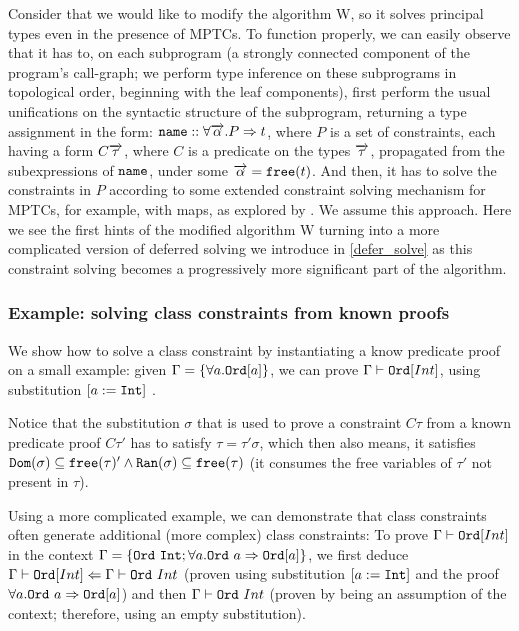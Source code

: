 Consider that we would like to modify the algorithm W, so it solves principal types even in the presence of MPTCs. To function properly, we can easily observe that it has to, on each subprogram (a strongly connected component of the program's call-graph; we perform type inference on these subprograms in topological order, beginning with the leaf components), first perform the usual unifications on the syntactic structure of the subprogram, returning a type assignment in the form: $\mathtt{name} :: \forall \overrightarrow{\alpha} . P  \Rightarrow t$, where $P$ is a set of constraints, each having a form $C \overrightarrow{\tau}$, where $C$ is a predicate on the types $\overrightarrow{\tau}$, propagated from the subexpressions of $\mathtt{name}$, under some $\overrightarrow{\alpha} = \mathtt{free} (t)$. And then, it has to solve the constraints in $P$ according to some extended constraint solving mechanism for MPTCs, for example, with maps, as explored by \cite{jones2000type}. We assume this approach. Here we see the first hints of the modified algorithm W turning into a more complicated version of deferred solving we introduce in \cref{defer_solve} as this constraint solving becomes a progressively more significant part of the algorithm.

\subsubsection{Example: solving class constraints from known proofs}

We show how to solve a class constraint by instantiating a know predicate proof on a small example: given $\Gamma = \{\forall a . \mathtt{Ord} [a]\}$, we can prove $\Gamma \vdash \mathtt{Ord} [Int]$, using substitution $[a := \mathtt{Int}]$ \cite{jones1999typing}.

Notice that the substitution $\sigma$ that is used to prove a constraint $C \tau$ from a known predicate proof $C \tau'$ has to satisfy $\tau = \tau' \sigma$, which then also means, it satisfies $\mathtt{Dom} (\sigma) \subseteq \mathtt{free} (\tau)' \land \mathtt{Ran} (\sigma) \subseteq \mathtt{free} (\tau)$ (it consumes the free variables of $\tau'$ not present in $\tau$).

Using a more complicated example, we can demonstrate that class constraints often generate additional (more complex) class constraints: To prove $\Gamma \vdash \mathtt{Ord} [Int]$ in the context $\Gamma = \{\mathtt{Ord}\ \mathtt{Int}; \forall a . \mathtt{Ord}\ a \Rightarrow \mathtt{Ord} [a]\}$, we first deduce $\Gamma \vdash \mathtt{Ord} [Int] \Leftarrow \Gamma \vdash \mathtt{Ord}\ Int$ (proven using substitution $[a := \mathtt{Int}]$ and the proof $\forall a . \mathtt{Ord}\ a \Rightarrow \mathtt{Ord} [a]$) and then $\Gamma \vdash \mathtt{Ord}\ Int$ (proven by being an assumption of the context; therefore, using an empty substitution).

